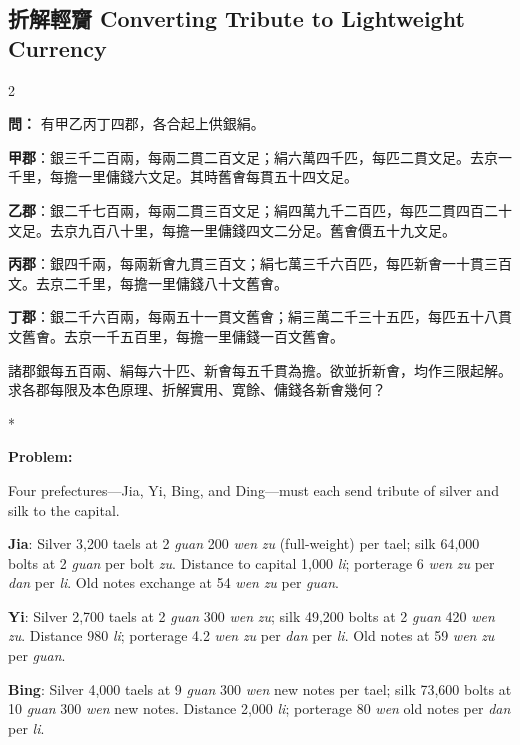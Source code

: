 \documentclass[11pt,a4paper]{article}
\newcommand{\CnQuestion}[1]{\par\noindent\textbf{\color{problemcolor}問：}#1\par\vspace{0.5ex}}
\newcommand{\EnQuestion}{\par\noindent\textbf{\color{problemcolor}Problem:}\par\vspace{0.5ex}}
\newcommand{\switchEn}{\switchcolumn[1]*}
\begin{document}
\newpage

\subsection*{折解輕齎 \quad Converting Tribute to Lightweight Currency}

\begin{paracol}{2}

\CnQuestion{%
有甲乙丙丁四郡，各合起上供銀絹。

\textbf{甲郡}：銀三千二百兩，每兩二貫二百文足；絹六萬四千匹，每匹二貫文足。去京一千里，每擔一里傭錢六文足。其時舊㑹每貫五十四文足。

\textbf{乙郡}：銀二千七百兩，每兩二貫三百文足；絹四萬九千二百匹，每匹二貫四百二十文足。去京九百八十里，每擔一里傭錢四文二分足。舊㑹價五十九文足。

\textbf{丙郡}：銀四千兩，每兩新㑹九貫三百文；絹七萬三千六百匹，每匹新㑹一十貫三百文。去京二千里，每擔一里傭錢八十文舊㑹。

\textbf{丁郡}：銀二千六百兩，每兩五十一貫文舊㑹；絹三萬二千三十五匹，每匹五十八貫文舊㑹。去京一千五百里，每擔一里傭錢一百文舊㑹。

諸郡銀每五百兩、絹每六十匹、新㑹每五千貫為擔。欲並折新㑹，均作三限起解。求各郡每限及本色原理、折解實用、寛餘、傭錢各新㑹幾何？
}

\switchEn

\EnQuestion
Four prefectures---Jia, Yi, Bing, and Ding---must each send tribute of silver and silk to the capital.

\textbf{Jia}: Silver 3,200 taels at 2 \textit{guan} 200 \textit{wen} \textit{zu} (full-weight) per tael; silk 64,000 bolts at 2 \textit{guan} per bolt \textit{zu}. Distance to capital 1,000 \textit{li}; porterage 6 \textit{wen} \textit{zu} per \textit{dan} per \textit{li}. Old notes exchange at 54 \textit{wen} \textit{zu} per \textit{guan}.

\textbf{Yi}: Silver 2,700 taels at 2 \textit{guan} 300 \textit{wen} \textit{zu}; silk 49,200 bolts at 2 \textit{guan} 420 \textit{wen} \textit{zu}. Distance 980 \textit{li}; porterage 4.2 \textit{wen} \textit{zu} per \textit{dan} per \textit{li}. Old notes at 59 \textit{wen} \textit{zu} per \textit{guan}.

\textbf{Bing}: Silver 4,000 taels at 9 \textit{guan} 300 \textit{wen} new notes per tael; silk 73,600 bolts at 10 \textit{guan} 300 \textit{wen} new notes. Distance 2,000 \textit{li}; porterage 80 \textit{wen} old notes per \textit{dan} per \textit{li}.


\end{paracol}
\end{document}

